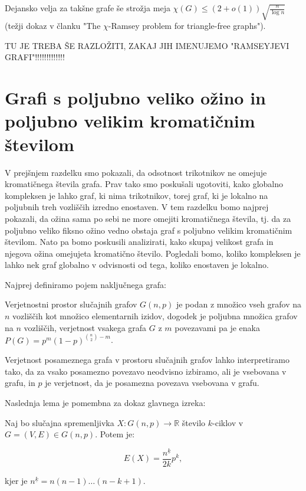 \documentclass[mat1, tisk]{fmfdelo}
\begin{document}
Dejansko velja za takšne grafe še strožja meja $\chi(G) \leq (2 + o(1))\sqrt{\frac{n}{\log{n}}}$ (težji dokaz v članku "The $\chi$-Ramsey problem for triangle-free graphs").

TU JE TREBA ŠE RAZLOŽITI, ZAKAJ JIH IMENUJEMO "RAMSEYJEVI GRAFI"!!!!!!!!!!!!!

\section{Grafi s poljubno veliko ožino in poljubno velikim kromatičnim številom}
V prejšnjem razdelku smo pokazali, da odsotnost trikotnikov ne omejuje kromatičnega števila grafa. Prav tako smo poskušali ugotoviti, kako globalno kompleksen je lahko graf, ki nima trikotnikov, torej graf,
ki je lokalno na poljubnih treh vozliščih izredno enostaven. V tem razdelku bomo najprej pokazali, da ožina sama po sebi ne more omejiti kromatičnega števila, tj. da za poljubno veliko fiksno ožino vedno obstaja
graf s poljubno velikim kromatičnim številom. Nato pa bomo poskusili analizirati, kako skupaj velikost grafa in njegova ožina omejujeta kromatično število. Pogledali bomo, koliko kompleksen je lahko nek graf globalno 
v odvisnosti od tega, koliko enostaven je lokalno.

Najprej definiramo pojem naključnega grafa:

    \begin{definicija}
        Verjetnostni prostor slučajnih grafov $G(n, p)$ je podan z množico vseh grafov na $n$ vozliščih kot množico elementarnih izidov, dogodek je poljubna množica grafov na $n$ vozliščih, verjetnost vsakega grafa $G$
        z $m$ povezavami pa je enaka $P(G) = p^m(1 - p)^{\binom{n}{2}-m}$.
    \end{definicija}

    \begin{opomba}
        Verjetnost posameznega grafa v prostoru slučajnih grafov lahko interpretiramo tako, da za vsako posamezno povezavo neodvisno izbiramo, ali je vsebovana v grafu, in $p$ je verjetnost, da je posamezna povezava vsebovana v grafu.
    \end{opomba}

Naslednja lema je pomembna za dokaz glavnega izreka:

    \begin{lema}
        Naj bo slučajna spremenljivka $X : G(n, p) \to \mathbb{R}$ število $k$-ciklov v $G = (V, E) \in G(n, p)$. Potem je:

        $$E(X) = \frac{n^{\underline{k}}}{2k}p^k,$$

        kjer je $n^{\underline{k}} = n(n-1)\ldots(n-k+1)$.
    \end{lema}
\end{document}
